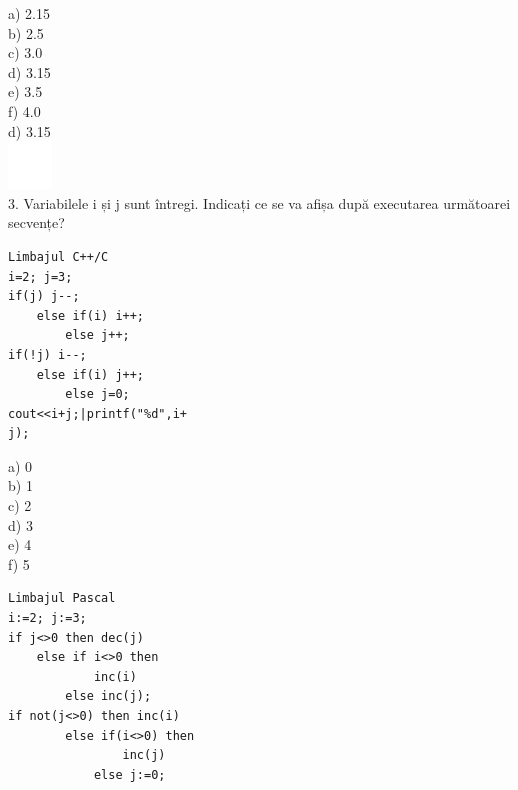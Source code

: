 \documentclass[10pt]{article}
\begin{document}
a) 2.15\\
b) 2.5\\
c) 3.0\\
d) 3.15\\
e) 3.5\\
f) 4.0\\
d) 3.15\\
\includegraphics[max width=\textwidth, center]{2025_04_17_46e04c6acd873ea9558dg-235(1)}\\
3. Variabilele i și j sunt întregi. Indicați ce se va afișa după executarea următoarei secvențe?

\begin{verbatim}
Limbajul C++/C
i=2; j=3;
if(j) j--;
    else if(i) i++;
        else j++;
if(!j) i--;
    else if(i) j++;
        else j=0;
cout<<i+j;|printf("%d",i+
j);
\end{verbatim}

a) 0\\
b) 1\\
c) 2\\
d) 3\\
e) 4\\
f) 5

\begin{verbatim}
Limbajul Pascal
i:=2; j:=3;
if j<>0 then dec(j)
    else if i<>0 then
            inc(i)
        else inc(j);
if not(j<>0) then inc(i)
        else if(i<>0) then
                inc(j)
            else j:=0;
\end{verbatim}
\end{document}
